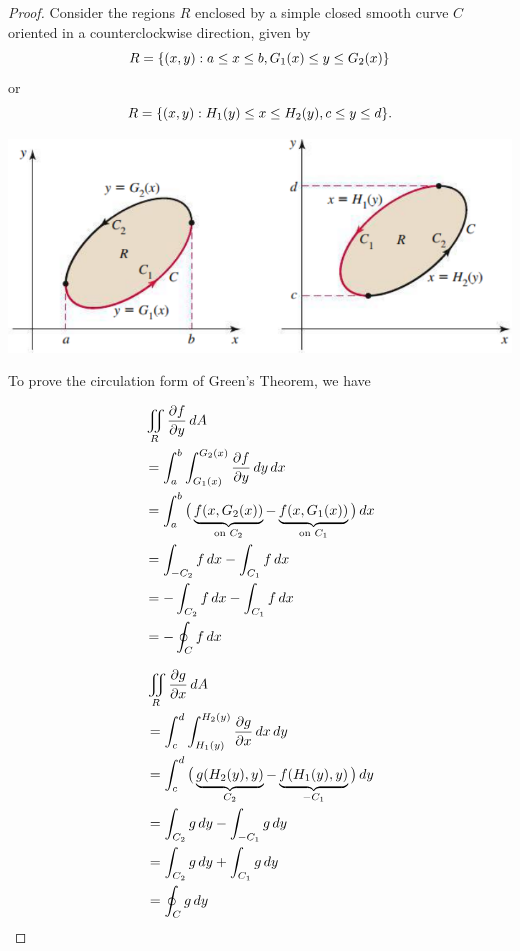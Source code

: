 \documentclass[mathNotesPreamble]{subfiles}
\begin{document}
  \begin{proof}
    Consider the regions $R$ enclosed by a simple closed smooth curve $C$ oriented in a counterclockwise direction, given by
      \[R={\left\{(x,y): a\leq x\leq b, G_1(x)\leq y\leq G_2(x)\right\}}\]
    or
      \[R={\left\{(x,y): H_1(y)\leq x\leq H_2(y), c\leq y\leq d\right\}}.\]
    \begin{center}
      \includegraphics[width=0.65\linewidth]{images/briggs_17_04/fig17_37}
    \end{center}
    To prove the circulation form of Green's Theorem, we have

    \begin{minipage}{0.5\linewidth}
      \begin{align*}
        &\iint\limits_R \frac{\partial f}{\partial y}\,dA\\
          &= \int_a^b \int_{G_1(x)}^{G_2(x)}\frac{\partial f}{\partial y}\,dy\,dx\\
          &=\int_a^b \big(\underbrace{f{\left(x,G_2(x)\right)}}_{\textnormal{on }C_2}-\underbrace{f{\left(x,G_1(x)\right)}}_{\textnormal{on }C_1}\big)\,dx\\
          &=\int_{-C_2} f\,dx-\int_{C_1} f\,dx\\
          &=-\int_{C_2} f\,dx-\int_{C_1} f\,dx\\
          &=-\oint_C f\,dx
      \end{align*}
    \end{minipage}%
    \begin{minipage}{0.5\linewidth}
      \begin{align*}
        &\iint\limits_R \frac{\partial g}{\partial x}\,dA\\
          &= \int_c^d \int_{H_1(y)}^{H_2(y)}\frac{\partial g}{\partial x}\,dx\,dy\\
          &=\int_c^d \big(\underbrace{g{\left(H_2(y),y\right)}}_{C_2}-\underbrace{f{\left(H_1(y),y\right)}}_{-C_1}\big)\,dy\\
          &=\int_{C_2} g\,dy-\int_{-C_1} g\,dy\\
          &=\int_{C_2} g\,dy+\int_{C_1} g\,dy\\
          &=\oint_C g\,dy
      \end{align*}
    \end{minipage}%
    
  \end{proof}
  \pagebreak 
 
\end{document}

